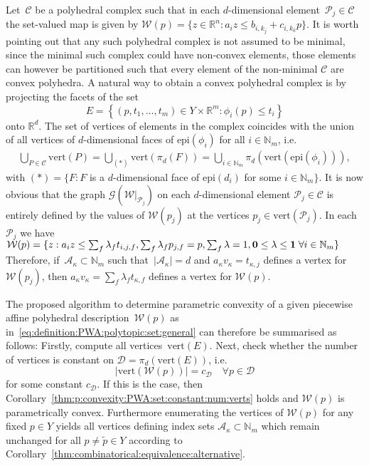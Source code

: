 \documentclass[smallextended]{svjour3}       %
\numberwithin{equation}{section}
\providecommand{\abs}[1]{\left|#1\right|}
\providecommand{\epi}{\text{epi}}
\begin{document}
Let~$\mathcal C$ be a polyhedral complex such that in each $d$-dimensional element~$\mathcal P_j\in\mathcal C$ the set-valued map is given by $\mathcal W(p) = \{z\in\mathbb R^n:a_i z\leq b_{i,k_j} + c_{i,k_k} p\}$. 
%
It is worth pointing out that any such polyhedral complex is not assumed to be minimal, since the minimal such complex could have non-convex elements, those elements can however be partitioned such that every element of the non-minimal $\mathcal C$ are convex polyhedra. 
%
A natural way to obtain a convex polyhedral complex is by projecting the facets of the set
%
\begin{equation}
  E=\left\{(p,t_1,\dots,t_m)\in Y\times\mathbb R^{m}:\phi_i(p)\leq t_i\right\}
\end{equation}
%
onto $\mathbb R^d$.
%
The set of vertices of elements in the complex coincides with the union of all vertices of $d$-dimensional faces of $\epi(\phi_i)$ for all $i\in\mathbb N_m$, i.e.
%
$$\begin{aligned}
	\bigcup_{P\in\mathcal C}\text{vert}(P) = \bigcup_{(\ast)} \text{vert}(\pi_d(F)) = \bigcup_{i\in\mathbb N_m}\pi_d(\text{vert}(\epi(\phi_i))),
\end{aligned}$$
%
with $(\ast) = \{F: F $ is a $d$-dimensional face of $\epi(d_i)$ for some $i\in\mathbb N_m\}$.
%
It is now obvious that the graph $\mathscr G(\mathcal W\vert_{\mathcal P_j})$ on each $d$-dimensional element $\mathcal P_j\in\mathcal C$ is entirely defined by the values of $\mathcal W(p_j)$ at the vertices $p_j\in\text{vert}(\mathcal P_j)$.
%
In each~$\mathcal P_j$ we have $\mathcal W(p) = \{z: a_i z\leq \sum_f \lambda_f t_{i,j,f}, \sum_f\lambda_f p_{j,f}=p, \sum_f\lambda=1,{\bf{0}}\leq\lambda\leq{\bf{1}}\; \forall i\in\mathbb N_m\}$
%
Therefore, if~$\mathcal A_\kappa\subset\mathbb N_m$ such that~$\abs{\mathcal A_\kappa}=d$ and $a_\kappa v_\kappa = t_{\kappa,j}$ defines a vertex for $\mathcal W(p_j)$, then $a_\kappa v_\kappa = \sum_f \lambda_f t_{\kappa,f}$ defines a vertex for $\mathcal W(p)$.

The proposed algorithm to determine parametric convexity of a given piecewise affine polyhedral description~$\mathcal W(p)$ as in~\eqref{eq:definition:PWA:polytopic:set:general} can therefore be summarised as follows:
%
Firstly, compute all vertices~$\text{vert}(E)$.
%
Next, check whether the number of vertices is constant on $\mathcal D = \pi_d\left(\text{vert}(E)\right)$, i.e. 
%
$$\abs{\text{vert}(\mathcal W(p))} = c_{\mathcal D} \quad \forall p\in\mathcal D$$
%
for some constant $c_{\mathcal D}$. If this is the case, then
Corollary~\ref{thm:p:convexity:PWA:set:constant:num:verts} holds and
$\mathcal W(p)$ is parametrically convex. Furthermore enumerating the vertices of $\mathcal W(p)$ for any fixed $p\in Y$ yields all vertices defining index sets $\mathcal A_\kappa\subset\mathbb N_m$ which remain unchanged for all $p\neq\tilde p\in Y$ according to Corollary~\ref{thm:combinatorical:equivalence:alternative}.
%
\end{document}
